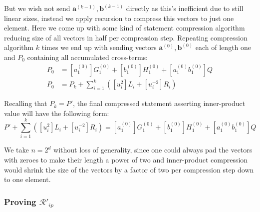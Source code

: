 \documentclass[../lecture-notes-148x210.tex]{subfiles}
\begin{document}
But we wish not send $\mathbf{a}^{(k-1)}, \mathbf{b}^{(k-1)}$ directly as this's inefficient due to still linear sizes, instead we apply recursion to compress this vectors to just one element. Here we come up with some kind of statement compression algorithm reducing size of all vectors in half per compression step. Repeating compression algorithm $k$ times we end up with sending vectors $\mathbf{a}^{(0)}, \mathbf{b}^{(0)}$ each of length one and $P_0$ containing all accumulated cross-terms:
\begin{align*}
    P_0 &= [a_1^{(0)}]G_1^{(0)} + [b_1^{(0)}]H_1^{(0)} + [a_1^{(0)}b_1^{(0)}]Q \\
    P_0 &= P_k + \sum_{i=1}^k ([u_i^2]L_i + [u_i^{-2}]R_i)
\end{align*}

Recalling that $P_k = P'$, the final compressed statement asserting inner-product value will have the following form:
\begin{equation}
    P' + \sum_{i=1}^k ([u_i^2]L_i + [u_i^{-2}]R_i) = [a_1^{(0)}]G_1^{(0)} + [b_1^{(0)}]H_1^{(0)} + [a_1^{(0)}b_1^{(0)}]Q
    \label{eq:ip-final-compressed}
\end{equation}

\begin{remark}
    We take $n=2^d$ without loss of generality, since one could always pad the vectors with zeroes to make their length a power of two and inner-product compression would shrink the size of the vectors by a factor of two per compression step down to one element.
\end{remark}

\subsubsection{Proving $\mathcal{R}'_{ip}$}
\end{document}
